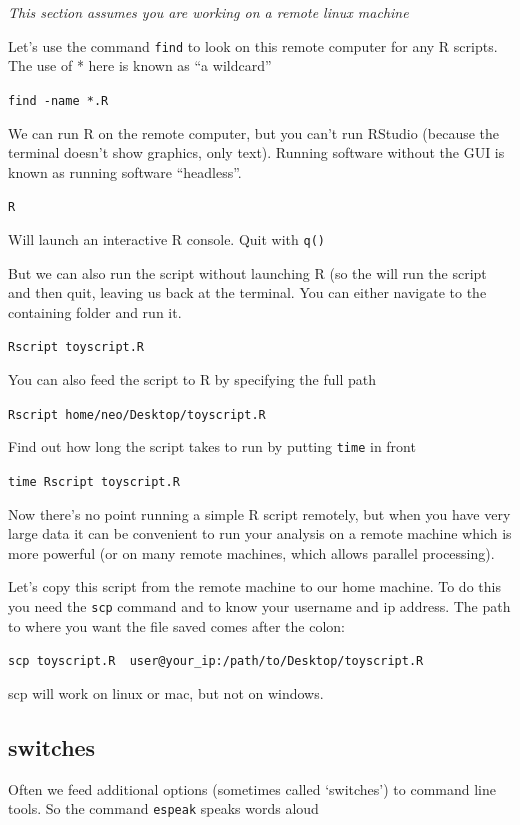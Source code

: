\documentclass[
]{book}
\begin{document}
\emph{This section assumes you are working on a remote linux machine}

Let's use the command \texttt{find} to look on this remote computer for any R scripts. The use of * here is known as ``a wildcard''

\texttt{find\ -name\ \textquotesingle{}*.R\textquotesingle{}}

We can run R on the remote computer, but you can't run RStudio (because the terminal doesn't show graphics, only text). Running software without the GUI is known as running software ``headless''.

\texttt{R}

Will launch an interactive R console. Quit with \texttt{q()}

But we can also run the script without launching R (so the will run the script and then quit, leaving us back at the terminal. You can either navigate to the containing folder and run it.

\texttt{Rscript\ toyscript.R}

You can also feed the script to R by specifying the full path

\texttt{Rscript\ home/neo/Desktop/toyscript.R}

Find out how long the script takes to run by putting \texttt{time} in front

\texttt{time\ Rscript\ toyscript.R}

Now there's no point running a simple R script remotely, but when you have very large data it can be convenient to run your analysis on a remote machine which is more powerful (or on many remote machines, which allows parallel processing).

Let's copy this script from the remote machine to our home machine. To do this you need the \texttt{scp} command and to know your username and ip address. The path to where you want the file saved comes after the colon:

\texttt{scp\ toyscript.R\ \ user@your\_ip:/path/to/Desktop/toyscript.R}

scp will work on linux or mac, but not on windows.

\hypertarget{switches}{%
\subsection{switches}\label{switches}}

Often we feed additional options (sometimes called `switches') to command line tools. So the command \texttt{espeak} speaks words aloud
\end{document}
